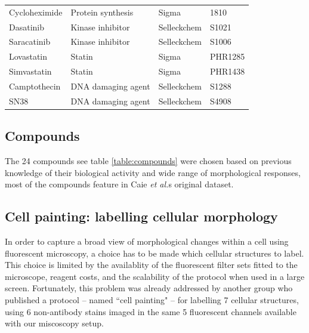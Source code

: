 \documentclass[a4paper,11pt,twoside,openright]{scrbook}
\begin{document}
\begin{table}[]
\begin{footnotesize}
\begin{tabular}{@{}llll@{}}
    Cycloheximide   & Protein synthesis      & Sigma       & 1810        \\
    Dasatinib       & Kinase inhibitor       & Selleckchem & S1021       \\
    Saracatinib     & Kinase inhibitor       & Selleckchem & S1006       \\
    Lovastatin      & Statin                 & Sigma       & PHR1285     \\
    Simvastatin     & Statin                 & Sigma       & PHR1438     \\
    Camptothecin    & DNA damaging agent     & Selleckchem & S1288       \\
    SN38            & DNA damaging agent     & Selleckchem & S4908       \\ \bottomrule
    \end{tabular}
    \end{footnotesize}
\end{table}





\subsection{Compounds}
The 24 compounds see table \ref{table:compounds} were chosen based on previous knowledge of their biological activity and wide range of morphological responses, most of the compounds feature in Caie \textit{et al.}s original dataset.


\subsection{Cell painting: labelling cellular morphology}
In order to capture a broad view of morphological changes within a cell using fluorescent microscopy, a choice has to be made which cellular structures to label.
This choice is limited by the availablity of the fluorescent filter sets fitted to the microscope, reagent costs, and the scalability of the protocol when used in a large screen.
Fortunately, this problem was already addressed by another group who published a protocol -- named ``cell painting" -- for labelling 7 cellular structures, using 6 non-antibody stains imaged in the same 5 fluorescent channels available with our miscoscopy setup. \cite{Gustafsdottir2013, Bray2016}
\end{document}
